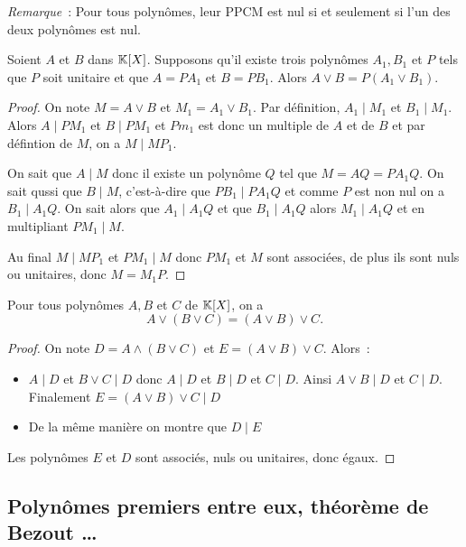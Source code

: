 \emph{Remarque}~: Pour tous polynômes, leur PPCM est nul si et seulement si l'un des deux polynômes est nul.

\begin{prop}
  Soient \(A\) et \(B\) dans \(\mathbb{K}[X]\). Supposons qu'il existe trois polynômes \(A_1,B_1\) et \(P\) tels que \(P\) soit unitaire et que \(A=PA_1\) et \(B=PB_1\). Alors \(A\vee B = P(A_1 \vee B_1)\).
\end{prop}
\begin{proof}
  On note \(M=A \vee B\) et \(M_1=A_1 \vee B_1\). Par définition, \(A_1\mid{}M_1\) et \(B_1\mid{}M_1\). Alors \(A\mid{}PM_1\) et \(B\mid{}PM_1\) et \(Pm_1\) est donc un multiple de \(A\) et de \(B\) et par défintion de \(M\), on a \(M\mid{}MP_1\).

  On sait que \(A\mid{}M\) donc il existe un polynôme \(Q\) tel que \(M=AQ=PA_1Q\). On sait qussi que \(B\mid{}M\), c'est-à-dire que \(PB_1\mid{}PA_1Q\) et comme \(P\) est non nul on a \(B_1\mid{}A_1Q\). On sait alors que \(A_1\mid{}A_1Q\) et que \(B_1\mid{}A_1Q\) alors \(M_1\mid{}A_1Q\) et en multipliant \(PM_1\mid{}M\).

  Au final \(M\mid{}MP_1\) et \(PM_1\mid{}M\) donc \(PM_1\) et \(M\) sont associées, de plus ils sont nuls ou unitaires, donc \(M=M_1P\).
\end{proof}

\begin{prop}[Associativité]
  Pour tous polynômes \(A,B\) et \(C\) de \(\mathbb{K}[X]\), on a
  \begin{equation}
    A \vee (B\vee C) = (A\vee B) \vee C.
  \end{equation}
\end{prop}
\begin{proof}
  On note \(D=A \wedge (B\vee C)\) et \(E=(A\vee B) \vee C\). Alors~:
  \begin{itemize}
  \item \(A\mid{}D\) et \(B \vee C\mid{}D\) donc \(A\mid{}D\) et \(B\mid{}D\) et \(C\mid{} D\). Ainsi \(A \vee B\mid{}D\) et \(C\mid{}D\). Finalement \(E=(A\vee B) \vee C\mid{}D\)
  \item De la même manière on montre que \(D\mid{}E\)
  \end{itemize}
  Les polynômes \(E\) et \(D\) sont associés, nuls ou unitaires, donc égaux.
\end{proof}

\subsection{Polynômes premiers entre eux, théorème de Bezout \ldots}

